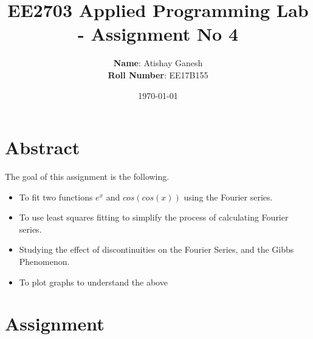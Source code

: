 \documentclass[11pt, a4paper]{article}
\title{EE2703 Applied Programming Lab - Assignment No 4}
\author{
  \textbf{Name}: Atishay Ganesh\\
  \textbf{Roll Number}: EE17B155
}\date{\today}
\begin{document}
		
\maketitle 
\section{Abstract}
The goal of this assignment is the following.
\begin{itemize}
\item To fit two functions $e^{x}$ and $cos(cos(x))$ using the Fourier series.
\item To use least squares fitting to simplify the process of calculating Fourier series.
\item Studying the effect of discontinuities on the Fourier Series, and the Gibbs Phenomenon.
\item To plot graphs to understand the above
\end{itemize}

\section{Assignment}
\end{document}
